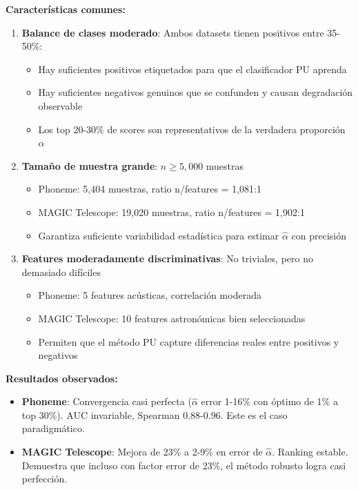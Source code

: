 \documentclass[a4paper,11pt]{article}
\begin{document}
\textbf{Características comunes:}
\begin{enumerate}
    \item \textbf{Balance de clases moderado}: Ambos datasets tienen positivos entre 35-50\%:
    \begin{itemize}
        \item Hay suficientes positivos etiquetados para que el clasificador PU aprenda
        \item Hay suficientes negativos genuinos que se confunden y causan degradación observable
        \item Los top 20-30\% de scores son representativos de la verdadera proporción $\alpha$
    \end{itemize}
    
    \item \textbf{Tamaño de muestra grande}: $n \geq 5{,}000$ muestras
    \begin{itemize}
        \item Phoneme: 5{,}404 muestras, ratio n/features = 1{,}081:1
        \item MAGIC Telescope: 19{,}020 muestras, ratio n/features = 1{,}902:1
        \item Garantiza suficiente variabilidad estadística para estimar $\hat{\alpha}$ con precisión
    \end{itemize}
    
    \item \textbf{Features moderadamente discriminativas}: No triviales, pero no demasiado difíciles
    \begin{itemize}
        \item Phoneme: 5 features acústicas, correlación moderada
        \item MAGIC Telescope: 10 features astronómicas bien seleccionadas
        \item Permiten que el método PU capture diferencias reales entre positivos y negativos
    \end{itemize}
\end{enumerate}

\textbf{Resultados observados:}
\begin{itemize}
    \item \textbf{Phoneme}: Convergencia casi perfecta ($\hat{\alpha}$ error 1-16\% con óptimo de 1\% a top 30\%). AUC invariable, Spearman 0.88-0.96. Este es el caso paradigmático.
    \item \textbf{MAGIC Telescope}: Mejora de 23\% a 2-9\% en error de $\hat{\alpha}$. Ranking estable. Demuestra que incluso con factor error de 23\%, el método robusto logra casi perfección.
\end{itemize}
\end{document}
